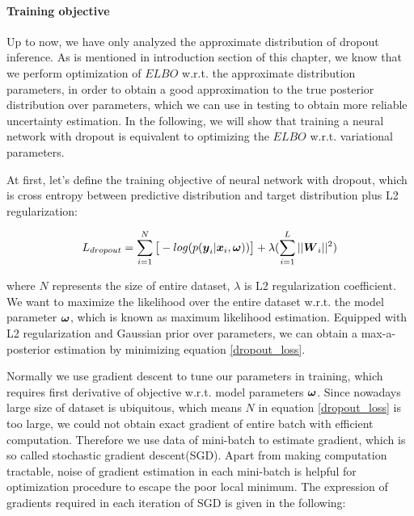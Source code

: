 \paragraph{Training objective} Up to now, we have only analyzed the approximate distribution of dropout inference. As is mentioned in introduction section of this chapter, we know that we perform optimization of $ELBO$ w.r.t. the approximate distribution parameters, in order to obtain a good approximation to the true posterior distribution over parameters, which we can use in testing to obtain more reliable uncertainty estimation. In the following, we will show that training a neural network with dropout is equivalent to optimizing the $ELBO$ w.r.t. variational parameters.

At first, let's define the training objective of neural network with dropout, which is cross entropy between predictive distribution and target distribution plus L2 regularization:

\begin{equation}
\begin{aligned} \label{dropout_loss}
L_{dropout}   = \sum_{i=1}^{N}\big[-log(p(\boldsymbol y_{i}| \boldsymbol x_{i}, \boldsymbol \omega))\big] + \lambda(\sum_{i=1}^{L} ||\boldsymbol W_{i}||^{2})
\end{aligned}
\end{equation}

where $N$ represents the size of entire dataset, $\lambda$ is L2 regularization coefficient. We want to maximize the likelihood over the entire dataset w.r.t. the model parameter $\boldsymbol \omega$, which is known as maximum likelihood estimation. Equipped with L2 regularization and Gaussian prior over parameters, we can obtain a max-a-posterior estimation by minimizing equation \ref{dropout_loss}. 

Normally we use gradient descent to tune our parameters in training, which requires first derivative of objective w.r.t. model parameters $\boldsymbol \omega$. Since nowadays large size of dataset is ubiquitous, which means $N$ in equation \ref{dropout_loss} is too large, we could not obtain exact gradient of entire batch with efficient computation. Therefore we use data of mini-batch to estimate gradient, which is so called stochastic gradient descent(SGD). Apart from making computation tractable, noise of gradient estimation in each mini-batch is helpful for optimization procedure to escape the poor local minimum. The expression of gradients required in each iteration of SGD is given in the following:


